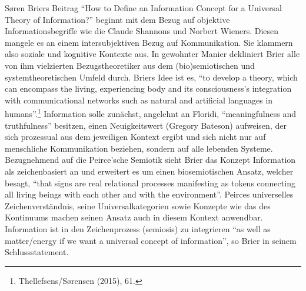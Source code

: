 \documentclass[a4paper,
fontsize=11pt,
oneside,
numbers=noperiodatend,
parskip=half-,
bibliography=totoc,
final
]{scrartcl}
\begin{document}
Søren Briers Beitrag \enquote{How to Define an Information Concept for a
Universal Theory of Information?} beginnt mit dem Bezug auf objektive
Informationsbegriffe wie die Claude Shannons und Norbert Wieners. Diesen
mangele es an einem intersubjektiven Bezug auf Kommunikation. Sie
klammern also soziale und kognitive Kontexte aus. In gewohnter Manier
dekliniert Brier alle von ihm vielzierten Bezugstheoretiker aus dem
(bio)semiotischen und systemtheoretischen Umfeld durch. Briers Idee ist
es, \enquote{to develop a theory, which can encompass the living,
experiencing body and its consciousness's integration with
communicational networks such as natural and artificial languages in
humans}.\footnote{Thellefsens/Sørensen (2015), 61.} Information solle
zunächst, angelehnt an Floridi, \enquote{meaningfulness and
truthfulness} besitzen, einen Neuigkeitswert (Gregory Bateson)
aufweisen, der sich prozessual aus dem jeweiligen Kontext ergibt und
sich nicht nur auf menschliche Kommunikation beziehen, sondern auf alle
lebenden Systeme. Bezugnehmend auf die Peirce'sche Semiotik sieht Brier
das Konzept Information als zeichenbasiert an und erweitert es um einen
biosemiotischen Ansatz, welcher besagt, \enquote{that signs are real
relational processes manifesting as tokens connecting all living beings
with each other and with the environment}. Peirces universelles
Zeichenverständnis, seine Universalkategorien sowie Konzepte wie das des
Kontinuums machen seinen Ansatz auch in diesem Kontext anwendbar.
Information ist in den Zeichenprozess (semiosis) zu integrieren
\enquote{as well as matter/energy if we want a universal concept of
information}, so Brier in seinem Schlussstatement.
\end{document}
